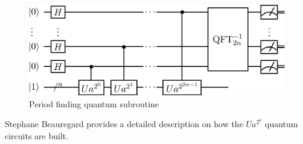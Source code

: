 \begin{figure}[h!]
    \centering
    \includegraphics[scale=.15]{images/Shor-QuantumPeriodFinding.png}
    \caption{Period finding quantum subroutine \cite{ShorQuantumSubroutineImage}}
    \label{fig:PeriodFindingQuantumSubroutine}
\end{figure}

Stephane Beauregard\cite{CircuitForShorAlgorithm_2003} provides a detailed description on how the $Ua^{2^k}$ quantum circuits are built.
